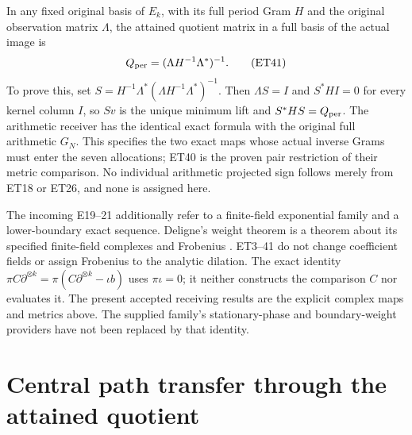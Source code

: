 \documentclass[11pt,a4paper]{article}
\begin{document}
In any fixed original basis of \(E_k\), with its full period Gram
\(H\) and the original observation matrix \(\Lambda\), the attained
quotient matrix in a full basis of the actual image is
\[
 Q_{\rm per}=(\Lambda H^{-1}\Lambda^*)^{-1}.           \tag{ET41}
\]
To prove this, set
\(S=H^{-1}\Lambda^*(\Lambda H^{-1}\Lambda^*)^{-1}\).
Then \(\Lambda S=I\) and \(S^*HI=0\) for every kernel column \(I\),
so \(Sv\) is the unique minimum lift and \(S^*HS=Q_{\rm per}\).
The arithmetic receiver has the identical exact formula with the
original full arithmetic \(G_N\). This specifies the two exact
maps whose actual inverse Grams must enter the seven allocations;
ET40 is the proven pair restriction of their metric comparison.
No individual arithmetic projected sign follows merely from ET18
or ET26, and none is assigned here.

The incoming E19--21 additionally refer to a finite-field exponential
family and a lower-boundary exact sequence. Deligne's weight theorem
is a theorem about its specified finite-field complexes and Frobenius
\cite[Thm.\ 3.3.1]{et:Deligne}. ET3--41 do not change coefficient fields
or assign Frobenius to the analytic dilation. The exact identity
\(\pi C\partial^{\otimes k}=\pi(C\partial^{\otimes k}-\iota b)\)
uses \(\pi\iota=0\); it neither constructs the comparison \(C\) nor
evaluates it. The present accepted receiving results are the explicit
complex maps and metrics above. The supplied family's stationary-phase
and boundary-weight providers have not been replaced by that identity.



\endgroup

\clearpage
\begingroup
\def\C{\mathbb C}
\def\R{\mathbb R}
\def\PP{\mathcal P}
\def\Bcal{\mathcal B}
\def\Rcal{\mathcal R}
\def\Scal{\mathcal S}
\def\norm#1{\left\lVert#1\right\rVert}
\def\ip#1#2{\left\langle#1,#2\right\rangle}
\def\Tr{\operatorname{Tr}}
\def\diag{\operatorname{diag}}
\def\im{\operatorname{im}}
\def\rem{\operatorname{rem}}
\def\rad{\operatorname{rad}}

\setcounter{equation}{0}
\renewcommand{\theequation}{CPT.\arabic{equation}}
\section*{Central path transfer through the attained quotient}
\end{document}
